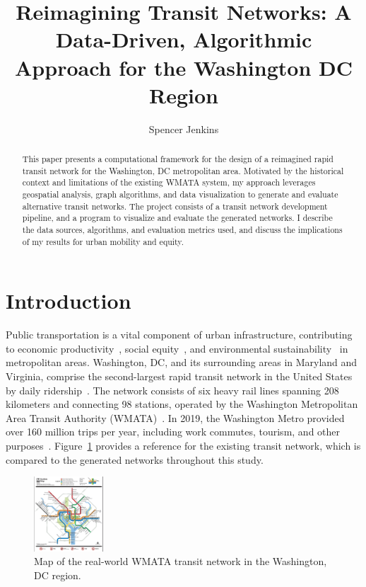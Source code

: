 \documentclass[sigconf,nonacm]{acmart}
\begin{document}
\title{Reimagining Transit Networks: A Data-Driven, Algorithmic Approach for the Washington DC Region}

\author{Spencer Jenkins}

\renewcommand{\shortauthors}{S. Jenkins}

\begin{abstract}
This paper presents a computational framework for the design of a reimagined rapid transit network for the Washington, DC metropolitan area. Motivated by the historical context and limitations of the existing WMATA system, my approach leverages geospatial analysis, graph algorithms, and data visualization to generate and evaluate alternative transit networks. The project consists of a transit network development pipeline, and a program to visualize and evaluate the generated networks. I describe the data sources, algorithms, and evaluation metrics used, and discuss the implications of my results for urban mobility and equity.
\end{abstract}

\maketitle



\section{Introduction}

Public transportation is a vital component of urban infrastructure, contributing to economic productivity~\cite{lit:us_transit_policy}, social equity~\cite{lit:equity}, and environmental sustainability~\cite{lit:us_transit_policy} in metropolitan areas. Washington, DC, and its surrounding areas in Maryland and Virginia, comprise the second-largest rapid transit network in the United States by daily ridership~\cite{lit:wmata_stats}. The network consists of six heavy rail lines spanning 208 kilometers and connecting 98 stations, operated by the Washington Metropolitan Area Transit Authority (WMATA)~\cite{lit:wmata_stats}. In 2019, the Washington Metro provided over 160 million trips per year, including work commutes, tourism, and other purposes~\cite{lit:wmata_stats}. Figure~\ref{fig:wmata} provides a reference for the existing transit network, which is compared to the generated networks throughout this study. 
\begin{figure}[ht]
    \centering
    \includegraphics[width=0.23\textwidth]{./img/wmata.png}
    \caption{Map of the real-world WMATA transit network in the Washington, DC region.}
    \label{fig:wmata}
\end{figure}
\end{document}
